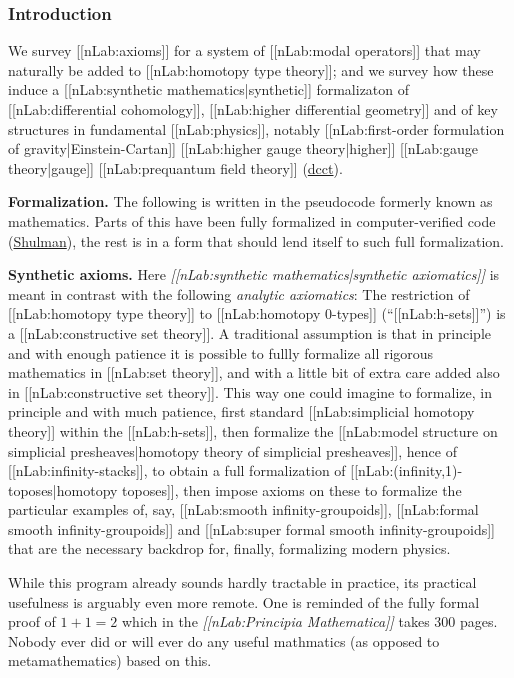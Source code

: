\documentclass[12pt,titlepage]{article}
\theoremstyle{plain}
\theoremstyle{definition}
\theoremstyle{remark}
\begin{document}
\hypertarget{introduction}{}\subsubsection*{{Introduction}}\label{introduction}

We survey [[nLab:axioms]] for a system of [[nLab:modal operators]] that may naturally be added to [[nLab:homotopy type theory]]; and we survey how these induce a [[nLab:synthetic mathematics|synthetic]] formalizaton of [[nLab:differential cohomology]], [[nLab:higher differential geometry]] and of key structures in fundamental [[nLab:physics]], notably [[nLab:first-order formulation of gravity|Einstein-Cartan]] [[nLab:higher gauge theory|higher]] [[nLab:gauge theory|gauge]] [[nLab:prequantum field theory]] (\hyperlink{dcct}{dcct}).

\textbf{Formalization.} The following is written in the pseudocode formerly known as mathematics. Parts of this have been fully formalized in computer-verified code (\hyperlink{Shulman}{Shulman}), the rest is in a form that should lend itself to such full formalization.

\textbf{Synthetic axioms.} Here \emph{[[nLab:synthetic mathematics|synthetic axiomatics]]} is meant in contrast with the following \emph{analytic axiomatics}: The restriction of [[nLab:homotopy type theory]] to [[nLab:homotopy 0-types]] (``[[nLab:h-sets]]'') is a [[nLab:constructive set theory]]. A traditional assumption is that in principle and with enough patience it is possible to fullly formalize all rigorous mathematics in [[nLab:set theory]], and with a little bit of extra care added also in [[nLab:constructive set theory]]. This way one could imagine to formalize, in principle and with much patience, first standard [[nLab:simplicial homotopy theory]] within the [[nLab:h-sets]], then formalize the [[nLab:model structure on simplicial presheaves|homotopy theory of simplicial presheaves]], hence of [[nLab:infinity-stacks]], to obtain a full formalization of [[nLab:(infinity,1)-toposes|homotopy toposes]], then impose axioms on these to formalize the particular examples of, say, [[nLab:smooth infinity-groupoids]], [[nLab:formal smooth infinity-groupoids]] and [[nLab:super formal smooth infinity-groupoids]] that are the necessary backdrop for, finally, formalizing modern physics.

While this program already sounds hardly tractable in practice, its practical usefulness is arguably even more remote. One is reminded of the fully formal proof of $1+1 = 2$ which in the \emph{[[nLab:Principia Mathematica]]} takes 300 pages. Nobody ever did or will ever do any useful mathmatics (as opposed to metamathematics) based on this.
\end{document}
